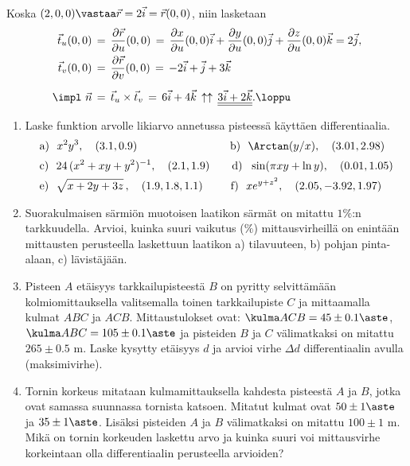 \ratk Koska $(2,0,0)\vastaa \vec r=2\vec i=\vec r(0,0)$, niin lasketaan
\begin{align*}
\vec t_u(0,0) &\,=\, \frac{\partial\vec r}{\partial u}(0,0)
               \,=\, \frac{\partial x}{\partial u}(0,0)\vec i
                     +\frac{\partial y}{\partial u}(0,0)\vec j
                     +\frac{\partial z}{\partial u}(0,0)\vec k=2\vec j, \\
\vec t_v(0,0) &\,=\, \frac{\partial\vec r}{\partial v}(0,0)
               \,=\, -2\vec i +\vec j +3\vec k \\[2mm]
\impl\ \vec n &\,=\, \vec t_u\times\vec t_v
               \,=\,6\vec i +4\vec k 
               \,\uparrow\uparrow\, \underline{\underline{3\vec i+2\vec k}}. \loppu
\end{align*}

\Harj
\begin{enumerate}

\item
Laske funktion arvolle likiarvo annetussa pisteessä käyttäen differentiaalia.
\begin{align*}
&\text{a)}\ \ x^2y^3, \quad (3.1,0.9) \qquad\qquad\qquad\qquad\
 \text{b)}\ \ \Arctan(y/x), \quad (3.01,2.98) \\[0.5mm]
&\text{c)}\ \ 24\,(x^2+xy+y^2)^{-1}, \quad (2.1,1.9) \qquad
 \text{d)}\ \ \sin(\pi xy+\ln y), \quad (0.01,1.05) \\
&\text{e)}\ \ \sqrt{x+2y+3z}\,, \quad (1.9,1.8,1.1) \qquad\,\
 \text{f)}\ \ xe^{y+z^2}, \quad (2.05,-3.92,1.97)
\end{align*}

\item
Suorakulmaisen särmiön muotoisen laatikon särmät on mitattu $1\%$:n tarkkuudella. Arvioi,
kuinka suuri vaikutus ($\%$) mittausvirheillä on enintään mittausten perusteella
laskettuun laatikon a) tilavuuteen, b) pohjan pinta-alaan, c) lävistäjään.

\item
Pisteen $A$ etäisyys tarkkailupisteestä $B$ on pyritty selvittämään kolmiomittauksella
valitsemalla toinen tarkkailupiste $C$ ja mittaamalla kulmat $ABC$ ja $ACB$. Mittaustulokset
ovat: $\kulma ACB=45 \pm 0.1\aste$, $\kulma ABC=105 \pm 0.1\aste$ ja pisteiden $B$ ja $C$
välimatkaksi on mitattu $265 \pm 0.5$ m. Laske kysytty etäisyys $d$ ja arvioi virhe $\Delta d$
differentiaalin avulla (maksimivirhe).

\item
Tornin korkeus mitataan kulmamittauksella kahdesta pisteestä $A$ ja $B$, jotka ovat
samassa suunnassa tornista katsoen. Mitatut kulmat ovat $50 \pm 1\aste$ ja $35 \pm 1\aste$.
Lisäksi pisteiden $A$ ja $B$ välimatkaksi on mitattu $100 \pm 1$ m. Mikä on tornin
korkeuden laskettu arvo ja kuinka suuri voi mittausvirhe korkeintaan olla differentiaalin
perusteella arvioiden?


\end{enumerate}
